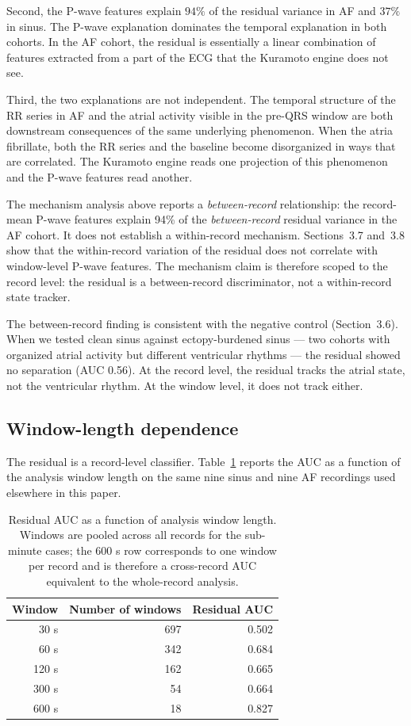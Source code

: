 \documentclass[11pt]{article}
\begin{document}
Second, the P-wave features explain $94\%$ of the residual variance in
AF and $37\%$ in sinus. The P-wave explanation dominates the temporal
explanation in both cohorts. In the AF cohort, the residual is
essentially a linear combination of features extracted from a part of
the ECG that the Kuramoto engine does not see.

Third, the two explanations are not independent. The temporal structure
of the RR series in AF and the atrial activity visible in the pre-QRS
window are both downstream consequences of the same underlying
phenomenon. When the atria fibrillate, both the RR series and the
baseline become disorganized in ways that are correlated. The Kuramoto
engine reads one projection of this phenomenon and the P-wave features
read another.

The mechanism analysis above reports a \emph{between-record}
relationship: the record-mean P-wave features explain 94\% of the
\emph{between-record} residual variance in the AF cohort. It does not
establish a within-record mechanism. Sections~3.7 and~3.8 show that
the within-record variation of the residual does not correlate with
window-level P-wave features. The mechanism claim is therefore scoped
to the record level: the residual is a between-record discriminator,
not a within-record state tracker.

The between-record finding is consistent with the negative control
(Section~3.6). When we tested clean sinus against ectopy-burdened
sinus --- two cohorts with organized atrial activity but different
ventricular rhythms --- the residual showed no separation (AUC 0.56).
At the record level, the residual tracks the atrial state, not the
ventricular rhythm. At the window level, it does not track either.

\subsection{Window-length dependence}

The residual is a record-level classifier. Table~\ref{tab:window}
reports the AUC as a function of the analysis window length on the
same nine sinus and nine AF recordings used elsewhere in this paper.

\begin{table}[h]
\centering
\begin{tabular}{rrr}
\toprule
Window & Number of windows & Residual AUC \\
\midrule
30 s   & 697 & 0.502 \\
60 s   & 342 & 0.684 \\
120 s  & 162 & 0.665 \\
300 s  &  54 & 0.664 \\
600 s  &  18 & 0.827 \\
\bottomrule
\end{tabular}
\caption{Residual AUC as a function of analysis window length.
Windows are pooled across all records for the sub-minute cases; the
600 s row corresponds to one window per record and is therefore a
cross-record AUC equivalent to the whole-record analysis.}
\label{tab:window}
\end{table}
\end{document}
